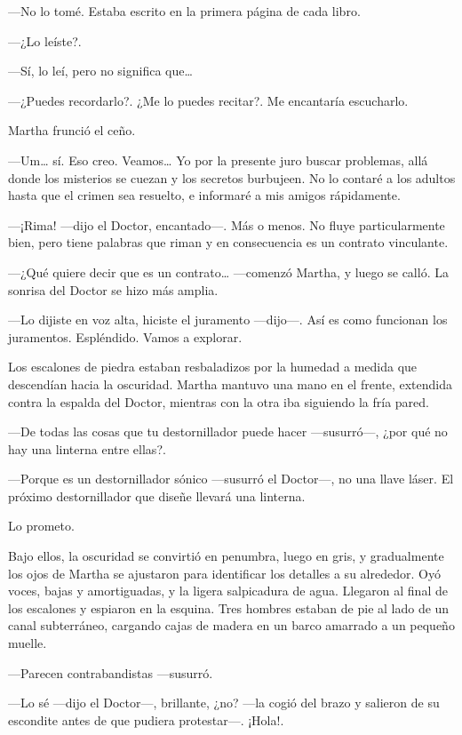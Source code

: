 ---No lo tomé. Estaba escrito en la primera página de cada libro.

---¿Lo leíste?.

---Sí, lo leí, pero no significa que\ldots{}

---¿Puedes recordarlo?. ¿Me lo puedes recitar?. Me encantaría escucharlo.

Martha frunció el ceño.

---Um\ldots{} sí. Eso creo. Veamos\ldots{} Yo por la presente juro buscar problemas, allá donde los misterios se cuezan y los secretos burbujeen. No lo contaré a los adultos hasta que el crimen sea resuelto, e informaré a mis amigos rápidamente.

---¡Rima! ---dijo el Doctor, encantado---. Más o menos. No fluye particularmente bien, pero tiene palabras que riman y en consecuencia es un contrato vinculante.

---¿Qué quiere decir que es un contrato\ldots{} ---comenzó Martha, y luego se calló. La sonrisa del Doctor se hizo más amplia.

---Lo dijiste en voz alta, hiciste el juramento ---dijo---. Así es como funcionan los juramentos. Espléndido. Vamos a explorar.

Los escalones de piedra estaban resbaladizos por la humedad a medida que descendían hacia la oscuridad. Martha mantuvo una mano en el frente, extendida contra la espalda del Doctor, mientras con la otra iba siguiendo la fría pared.

---De todas las cosas que tu destornillador puede hacer ---susurró---, ¿por qué no hay una linterna entre ellas?.

---Porque es un destornillador sónico ---susurró el Doctor---, no una llave láser. El próximo destornillador que diseñe llevará una linterna.

Lo prometo.

Bajo ellos, la oscuridad se convirtió en penumbra, luego en gris, y gradualmente los ojos de Martha se ajustaron para identificar los detalles a su alrededor. Oyó voces, bajas y amortiguadas, y la ligera salpicadura de agua. Llegaron al final de los escalones y espiaron en la esquina. Tres hombres estaban de pie al lado de un canal subterráneo, cargando cajas de madera en un barco amarrado a un pequeño muelle.

---Parecen contrabandistas ---susurró.

---Lo sé ---dijo el Doctor---, brillante, ¿no? ---la cogió del brazo y salieron de su escondite antes de que pudiera protestar---. ¡Hola!.

